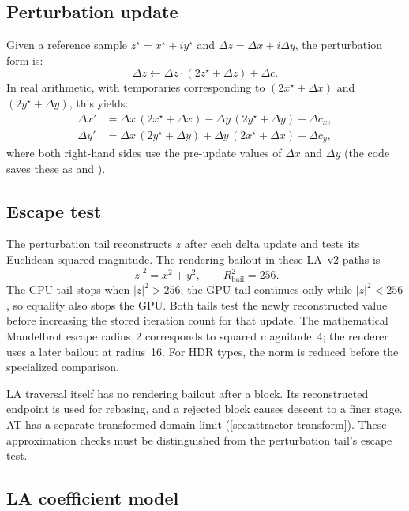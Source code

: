 \subsection{Perturbation update}
Given a reference sample \(z^\star=x^\star+iy^\star\) and \(\Delta z=\Delta
x+i\Delta y\), the perturbation form is:
\[
\Delta z \leftarrow \Delta z\cdot(2z^\star+\Delta z) + \Delta c.
\]
In real arithmetic, with temporaries corresponding to \((2x^\star+\Delta x)\)
and \((2y^\star+\Delta y)\), this yields:
\begin{align}
\Delta x' &= \Delta x\,(2x^\star+\Delta x) - \Delta y\,(2y^\star+\Delta y) + \Delta c_x, \\
\Delta y' &= \Delta x\,(2y^\star+\Delta y) + \Delta y\,(2x^\star+\Delta x) + \Delta c_y,
\end{align}
where both right-hand sides use the pre-update values of \(\Delta x\) and
\(\Delta y\) (the code saves these as  and
).

\subsection{Escape test}
The perturbation tail reconstructs $z$ after each delta update and tests
its Euclidean squared magnitude. The rendering bailout in these LA~v2
paths is
\[
|z|^2=x^2+y^2,\qquad R_{\mathrm{bail}}^2=256.
\]
The CPU tail stops when $|z|^2>256$; the GPU tail continues only while
$|z|^2<256$, so equality also stops the GPU. Both tails test the newly
reconstructed value before increasing the stored iteration count for
that update. The mathematical Mandelbrot escape radius~2 corresponds
to squared magnitude~4; the renderer uses a later bailout at radius~16.
For HDR types, the norm is reduced before the specialized comparison.

LA traversal itself has no rendering bailout after a block. Its
reconstructed endpoint is used for rebasing, and a rejected block
causes descent to a finer stage. AT has a separate transformed-domain
limit (\cref{sec:attractor-transform}). These approximation checks
must be distinguished from the perturbation tail's escape test.

\subsection{LA coefficient model}
\label{sec:la-coeff-model}

